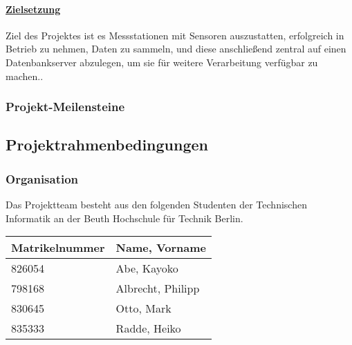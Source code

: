 \paragraph{\uline{Zielsetzung}}
%
Ziel des Projektes ist es Messstationen mit Sensoren auszustatten, erfolgreich in Betrieb zu nehmen, Daten zu sammeln, und diese anschließend zentral auf einen Datenbankserver abzulegen, um sie für weitere Verarbeitung verfügbar zu machen..

\subsubsection{Projekt-Meilensteine}




\subsection{Projektrahmenbedingungen}

\subsubsection{Organisation}


Das Projektteam besteht aus den folgenden Studenten der Technischen Informatik an der Beuth Hochschule für Technik Berlin.

\begin{table}[H]
	\centering
	\begin{tabular}{ |l|l| }
		\hline  %
		\rowcolor[gray]{.8}%
		\rule{0pt}{18pt}%
		\textbf{Matrikelnummer} & \textbf{Name, Vorname} \\
		\hline  %
		826054 & Abe, Kayoko \\
		\hline
		798168 & Albrecht, Philipp \\
		\hline
		830645 & Otto, Mark \\
		\hline
		835333 & Radde, Heiko \\
		\hline
	\end{tabular}
\end{table}

